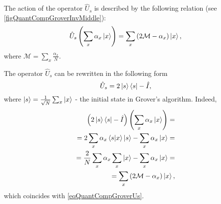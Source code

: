 

The action of the operator $\hat{U}_s$ is described by the following relation
(see \autoref{figQuantCompGroverInvMiddle}):
\begin{equation}
\hat{U}_s\left(\sum_x \alpha_x \ket{x}\right) = 
\sum_x \left(2 \mathcal{M} - \alpha_x \right)\ket{x},
\label{eqQuantCompGroverUs}
\end{equation} 
where $\mathcal{M} = \sum_x \frac{\alpha_x}{N}$.

The operator $\hat{U}_s$ can be rewritten in the following form
\begin{equation}
\hat{U}_s = 
2 \ket{s}\bra{s} - \hat{I},
\nonumber
\end{equation}
where $\ket{s}=\frac{1}{\sqrt{N}}\sum_x \ket{x}$ -
the initial state in Grover's algorithm.
Indeed,
\begin{eqnarray}
\left(2 \ket{s}\bra{s} - \hat{I}\right)
\left(\sum_x \alpha_x \ket{x}\right) =
\nonumber \\
=  2 \sum_x \alpha_x \bra{s}\ket{x} \ket{s} 
- \sum_x \alpha_x \ket{x} = 
\nonumber \\
=
\frac{2}{N} \sum_x \alpha_x \sum_x \ket{x} -
\sum_x \alpha_x \ket{x} = 
\nonumber \\
= \sum_x \left( 2 \mathcal{M} -\alpha_x \right) \ket{x},
\nonumber
\end{eqnarray}
which coincides with \eqref{eqQuantCompGroverUs}.



